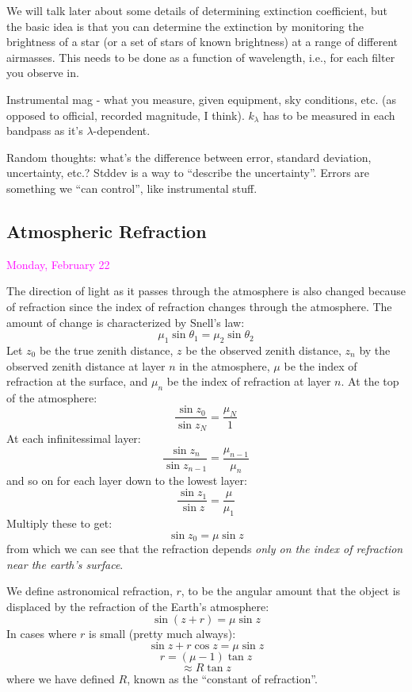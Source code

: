 \documentclass[12pt]{article}
\begin{document}
We will talk later about some details of determining extinction
coefficient, but the basic idea is that you can determine the
extinction by monitoring the brightness of a star (or a set of stars
of known brightness) at a range of different airmasses. This needs to
be done as a function of wavelength, i.e., for each filter you observe
in.

\textcolor{myBlue}{Instrumental mag - what you measure, given
    equipment, sky conditions, etc. (as opposed to official, recorded
    magnitude, I think). $k_{\lambda}$ has to be measured in each
    bandpass as it's $\lambda$-dependent.
}

\textcolor{myBlue}{Random thoughts: what's the difference between
    error, standard deviation, uncertainty, etc.?
    Stddev is a way to ``describe the uncertainty''. Errors are
    something we ``can control'', like instrumental stuff.
}

\subsection*{Atmospheric Refraction}
\textcolor{magenta}{Monday, February 22}

The direction of light as it passes through the atmosphere is also
changed because of refraction since the index of refraction changes
through the atmosphere. The amount of change is characterized by
Snell's law:
    $$ \mu_1\sin\theta_1 = \mu_2\sin\theta_2 $$
Let $z_0$ be the true zenith distance, $z$ be the observed zenith
distance, $z_n$ by the observed zenith distance at layer $n$ in the
atmosphere, $\mu$ be the index of refraction at the surface, and
$\mu_n$ be the index of refraction at layer $n$. At the top of the
atmosphere:
    $$ \frac{\sin z_0}{\sin z_N} = \frac{\mu_N}{1} $$
At each infinitessimal layer:
    $$ \frac{\sin z_n}{\sin z_{n-1}} = \frac{\mu_{n-1}}{\mu_n}  $$
and so on for each layer down to the lowest layer:
    $$ \frac{\sin z_1}{\sin z} = \frac{\mu}{\mu_1}  $$
Multiply these to get:
    $$ \sin z_0 = \mu\sin z  $$
from which we can see that the refraction depends
\emph{only on the index of refraction near the earth's surface}.

We define astronomical refraction, $r$, to be the angular amount that
the object is displaced by the refraction of the Earth's atmosphere: 
    $$ \sin(z+r) = \mu\sin z $$
In cases where $r$ is small (pretty much always):
    $$ \sin z + r\cos z = \mu\sin z $$
    $$ r = (\mu-1) \tan z $$
    $$ \approx R\tan z $$
where we have defined $R$, known as the ``constant of refraction''.
\end{document}
